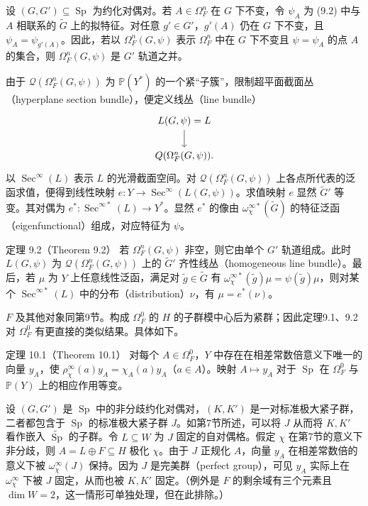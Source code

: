 设 $(G,G')\subseteq\operatorname{Sp}$ 为约化对偶对。若 $A\in\Omega_F^n$ 在 $G$ 下不变，令 $\psi_A$ 为 (9.2) 中与 $A$ 相联系的 $\widetilde G$ 上的拟特征。对任意 $g'\in G'$，$g'(A)$ 仍在 $G$ 下不变，且 $\psi_A=\psi_{g'(A)}$。因此，若以 $\Omega_F^n(G,\psi)$ 表示 $\Omega_F^n$ 中在 $G$ 下不变且 $\psi=\psi_A$ 的点 $A$ 的集合，则 $\Omega_F^n(G,\psi)$ 是 $G'$ 轨道之并。

由于 $\mathcal Q(\Omega_F^n(G,\psi))$ 为 $\mathbb P(Y^*)$ 的一个紧“子簇”，限制超平面截面丛（hyperplane section bundle），便定义线丛（line bundle）
\[
\begin{tikzcd}L(G,\psi)=L\arrow[d]\\\mathcal Q(\Omega_F^n(G,\psi)).\end{tikzcd}
\]
以 $\operatorname{Sec}^\infty(L)$ 表示 $L$ 的光滑截面空间。对 $\mathcal Q(\Omega_F^n(G,\psi))$ 上各点所代表的泛函求值，便得到线性映射 $e:Y\to\operatorname{Sec}^\infty(L(G,\psi))$。求值映射 $e$ 显然 $\widetilde G'$ 等变。其对偶为 $e^*:\operatorname{Sec}^{\infty *}(L)\to Y^*$。显然 $e^*$ 的像由 $\omega_\chi^{\infty *}(\widetilde G)$ 的特征泛函（eigenfunctional）组成，对应特征为 $\psi$。
\begin{originaltheorem}{定理 9.2（Theorem 9.2）}
若 $\Omega_F^n(G,\psi)$ 非空，则它由单个 $G'$ 轨道组成。此时 $L(G,\psi)$ 为 $\mathcal Q(\Omega_F^n(G,\psi))$ 上的 $\widetilde G'$ 齐性线丛（homogeneous line bundle）。最后，若 $\mu$ 为 $Y$ 上任意线性泛函，满足对 $\widetilde g\in\widetilde G$ 有 $\omega_\chi^{\infty *}(\widetilde g)\mu=\psi(\widetilde g)\mu$，则对某个 $\operatorname{Sec}^{\infty *}(L)$ 中的分布（distribution）$\nu$，有 $\mu=e^*(\nu)$。
\end{originaltheorem}
$F$ 及其他对象同第9节。构成 $\Omega_F^0$ 的 $H$ 的子群模中心后为紧群；因此定理9.1、9.2 对 $\Omega_F^0$ 有更直接的类似结果。具体如下。
\begin{originaltheorem}{定理 10.1（Theorem 10.1）}
对每个 $A\in\Omega_F^0$，$Y$ 中存在在相差常数倍意义下唯一的向量 $y_A$，使 $\rho_\chi^\infty(a)y_A=\chi_A(a)y_A$（$a\in A$）。映射 $A\mapsto y_A$ 对于 $\operatorname{Sp}$ 在 $\Omega_F^0$ 与 $\mathbb P(Y)$ 上的相应作用等变。
\end{originaltheorem}
设 $(G,G')$ 是 $\operatorname{Sp}$ 中的非分歧约化对偶对，$(K,K')$ 是一对标准极大紧子群，二者都包含于 $\operatorname{Sp}$ 的标准极大紧子群 $J$。如第7节所述，可以将 $J$ 从而将 $K,K'$ 看作嵌入 $\widetilde{\operatorname{Sp}}$ 的子群。令 $L\subseteq W$ 为 $J$ 固定的自对偶格。假定 $\chi$ 在第7节的意义下非分歧，则 $A=L\oplus F\subseteq H$ 极化 $\chi$。由于 $J$ 正规化 $A$，向量 $y_A$ 在相差常数倍的意义下被 $\omega_\chi^\infty(J)$ 保持。因为 $J$ 是完美群（perfect group），可见 $y_A$ 实际上在 $\omega_\chi^\infty$ 下被 $J$ 固定，从而也被 $K,K'$ 固定。（例外是 $F$ 的剩余域有三个元素且 $\dim W=2$，这一情形可单独处理，但在此排除。）
